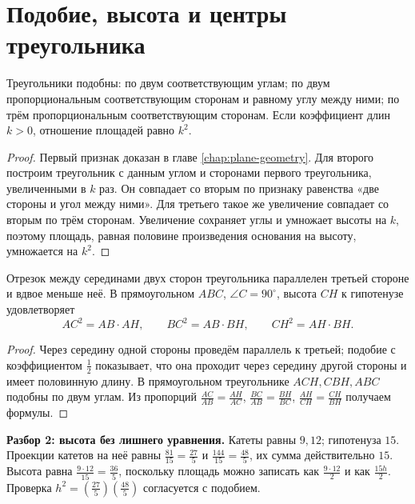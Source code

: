 \section{Подобие, высота и центры треугольника}
\begin{theorem}\label{thm:exam-plane-similarity}
Треугольники подобны: по двум соответствующим углам; по двум пропорциональным соответствующим сторонам и равному углу между ними; по трём пропорциональным соответствующим сторонам. Если коэффициент длин \(k>0\), отношение площадей равно \(k^2\).
\end{theorem}
\begin{proof}Первый признак доказан в главе \ref{chap:plane-geometry}. Для второго построим треугольник с данным углом и сторонами первого треугольника, увеличенными в \(k\) раз. Он совпадает со вторым по признаку равенства «две стороны и угол между ними». Для третьего такое же увеличение совпадает со вторым по трём сторонам. Увеличение сохраняет углы и умножает высоты на \(k\), поэтому площадь, равная половине произведения основания на высоту, умножается на \(k^2\).\end{proof}
\begin{theorem}\label{thm:exam-plane-midline}
Отрезок между серединами двух сторон треугольника параллелен третьей стороне и вдвое меньше неё. В прямоугольном \(ABC\), \(\angle C=90^\circ\), высота \(CH\) к гипотенузе удовлетворяет
\[
AC^2=AB\cdot AH,\qquad BC^2=AB\cdot BH,\qquad CH^2=AH\cdot BH.
\]
\end{theorem}
\begin{proof}Через середину одной стороны проведём параллель к третьей; подобие с коэффициентом \(\frac{1}{2}\) показывает, что она проходит через середину другой стороны и имеет половинную длину. В прямоугольном треугольнике \(ACH,CBH,ABC\) подобны по двум углам. Из пропорций \(\frac{AC}{AB}=\frac{AH}{AC}\), \(\frac{BC}{AB}=\frac{BH}{BC}\), \(\frac{AH}{CH}=\frac{CH}{BH}\) получаем формулы.\end{proof}
\begin{example}\textbf{Разбор 2: высота без лишнего уравнения.} Катеты равны \(9,12\); гипотенуза \(15\). Проекции катетов на неё равны \(\frac{81}{15}=\frac{27}{5}\) и \(\frac{144}{15}=\frac{48}{5}\), их сумма действительно \(15\). Высота равна \(\frac{9\cdot12}{15}=\frac{36}{5}\), поскольку площадь можно записать как \(\frac{9\cdot12}{2}\) и как \(\frac{15h}{2}\). Проверка \(h^2=(\frac{27}{5})(\frac{48}{5})\) согласуется с подобием.\end{example}

